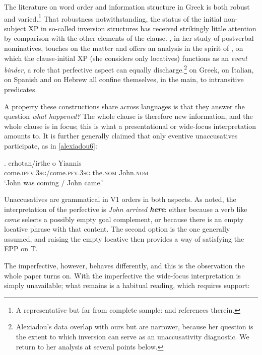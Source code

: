 \documentclass[11pt]{article}
\newcommand{\pfv}{\textsc{pfv}\xspace}
\newcommand{\ipfv}{\textsc{ipfv}\xspace}
\begin{document}
The literature on word order and information structure in Greek is both robust and varied.\footnote{A representative but far from complete sample: \citet{philippaki:85, tsimpli:90, alexiadou:99, alexiadou:00, spyropoulos-philippaki:01, georgiafentis:03, sifaki:03, roussou-tsimpli:06, gryllia:08, kechagias:10, haidou:12} and references therein.}  That robustness notwithstanding, the status of the initial non-subject XP in so-called inversion structures has received strikingly little attention by comparison with the other elements of the clause.  \citet{alexiadou:11b}, in her study of postverbal nominatives, touches on the matter and offers an analysis in the spirit of \citet{Borer:05a}, on which the clause-initial XP (she considers only locatives) functions as an \emph{event binder}, a role that perfective aspect can equally discharge.\footnote{Alexiadou's data overlap with ours but are narrower, because her question is the extent to which inversion can serve as an unaccusativity diagnostic.  We return to her analysis at several points below.}  \citet{alexiadou:96, alexiadou:11b} on Greek, \citet{pinto:97} on Italian, \citet{torrego:89} on Spanish and \citet{Borer:05a} on Hebrew all confine themselves, in the main, to intransitive predicates.

A property these constructions share across languages is that they answer the question \emph{what happened?}  The whole clause is therefore new information, and the whole clause is in focus; this is what a presentational or wide-focus interpretation amounts to.  It is further generally claimed that only eventive unaccusatives participate, as in \ref{alexiadou6}:

\exg. erhotan/irthe o Yiannis\\
come.\ipfv.3\textsc{sg}/come.\pfv.3\textsc{sg} the.\textsc{nom} John.\textsc{nom}\\ \label{alexiadou6}
`John was coming / John came.'

Unaccusatives are grammatical in V1 orders in both aspects.  As noted, the interpretation of the perfective is \emph{John arrived \textbf{here}}: either because a verb like \emph{come} selects a possibly empty goal complement, or because there is an empty locative phrase with that content.  The second option is the one generally assumed, and raising the empty locative then provides a way of satisfying the EPP on T.

The imperfective, however, behaves differently, and this is the observation the whole paper turns on.  With the imperfective the wide-focus interpretation is simply unavailable; what remains is a habitual reading, which requires support:
\end{document}
